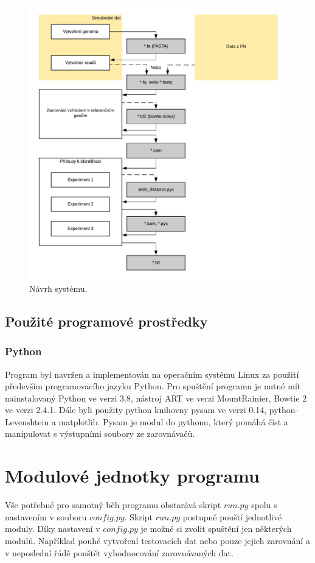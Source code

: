 \documentclass[czech,DP]{thesiskiv}
\numberwithin{equation}{section}
\begin{document}
\begin{figure}[H]
		\centering
		\includegraphics[width=\textwidth]{./img/navrh_systemu.pdf}
		\caption{Návrh systému. }
		\label{fig:navrh_systemu}
\end{figure}

\subsection{Použité programové prostředky}
\subsubsection{Python}
Program byl navržen a implementován na operačním systému Linux za použití především programovacího jazyku Python. Pro spuštění programu je nutné mít nainstalovaný Python ve verzi 3.8, nástroj ART ve verzi MountRainier, Bowtie 2 ve verzi 2.4.1. Dále byli použity python knihovny pysam ve verzi 0.14, python-Levenshtein a matplotlib. Pysam je modul do pythonu, který pomáhá číst a manipulovat s výstupními soubory ze zarovnávačů.

\section{Modulové jednotky programu}
Vše potřebné pro samotný běh programu obstarává skript $run.py$ spolu s nastavením v souboru $config.py$. Skript $run.py$ postupně pouští jednotlivé moduly. Díky nastavení v $config.py$ je možné si zvolit spuštění jen některých modulů. Například pouhé vytvoření testovacích dat nebo pouze jejich zarovnání a v neposlední řádě pouštět vyhodnocování zarovnávaných dat.
\end{document}
